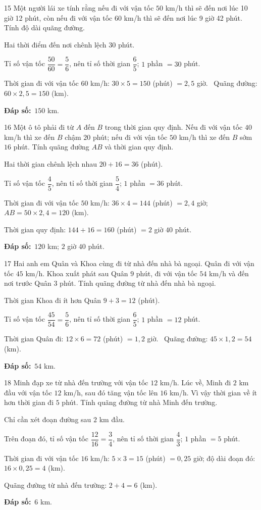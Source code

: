 \documentclass[11pt]{article}
\newif\ifsol \solfalse
\providecommand{\AnsWord}{Đáp số}
\newcommand{\dapso}[1]{\par\textbf{\AnsWord:}\ #1}
\newcommand{\probsol}[1]{%
  \begin{lrbox}{\solmeasure}\begin{minipage}{\dimexpr\linewidth-24pt\relax}#1\end{minipage}\end{lrbox}%
  \ifsol
    \begin{solbox}#1\end{solbox}%
  \else
    \setlength{\solht}{\dimexpr\ht\solmeasure+\dp\solmeasure+0.85cm\relax}%
    \ifdim\solht<1.35cm\setlength{\solht}{1.35cm}\fi
    \begin{tcolorbox}[colback=white,colframe=Line,boxrule=0.8pt,arc=5pt,
      left=8pt,right=8pt,top=4pt,bottom=4pt,height=\solht]{\footnotesize\color{Slate}\itshape\WorkWord}\end{tcolorbox}%
  \fi}
\newcommand{\gap}{\vspace{0.3cm}}
\def\WorkWord{Bài làm:}
\def\AnsWord{Đáp số}
\begin{document}
\gap
\begin{probbox}{15}{\relax}
Một người lái xe tính rằng nếu đi với vận tốc $50$ km/h thì sẽ đến nơi lúc 10 giờ 12 phút, còn nếu đi với vận tốc $60$ km/h thì sẽ đến nơi lúc 9 giờ 42 phút. Tính độ dài quãng đường.
\end{probbox}
\probsol{
Hai thời điểm đến nơi chênh lệch $30$ phút.\par Tỉ số vận tốc $\dfrac{50}{60}=\dfrac56$, nên tỉ số thời gian $\dfrac65$; $1$ phần $=30$ phút.\par
Thời gian đi với vận tốc $60$ km/h: $30\times5=150$ (phút) $=2{,}5$ giờ. \ Quãng đường: $60\times2{,}5=150$ (km).
\dapso{$150$ km.}}
\gap
\begin{probbox}{16}{\relax}
Một ô tô phải đi từ $A$ đến $B$ trong thời gian quy định. Nếu đi với vận tốc $40$ km/h thì xe đến $B$ chậm $20$ phút; nếu đi với vận tốc $50$ km/h thì xe đến $B$ sớm $16$ phút. Tính quãng đường $AB$ và thời gian quy định.
\end{probbox}
\probsol{
Hai thời gian chênh lệch nhau $20+16=36$ (phút).\par Tỉ số vận tốc $\dfrac45$, nên tỉ số thời gian $\dfrac54$; $1$ phần $=36$ phút.\par
Thời gian đi với vận tốc $50$ km/h: $36\times4=144$ (phút) $=2{,}4$ giờ; $AB=50\times2{,}4=120$ (km).\par
Thời gian quy định: $144+16=160$ (phút) $=2$ giờ $40$ phút.
\dapso{$120$ km; $2$ giờ $40$ phút.}}
\gap
\begin{probbox}{17}{\relax}
Hai anh em Quân và Khoa cùng đi từ nhà đến nhà bà ngoại. Quân đi với vận tốc $45$ km/h. Khoa xuất phát sau Quân $9$ phút, đi với vận tốc $54$ km/h và đến nơi trước Quân $3$ phút. Tính quãng đường từ nhà đến nhà bà ngoại.
\end{probbox}
\probsol{
Thời gian Khoa đi ít hơn Quân $9+3=12$ (phút).\par Tỉ số vận tốc $\dfrac{45}{54}=\dfrac56$, nên tỉ số thời gian $\dfrac65$; $1$ phần $=12$ phút.\par
Thời gian Quân đi: $12\times6=72$ (phút) $=1{,}2$ giờ. \ Quãng đường: $45\times1{,}2=54$ (km).
\dapso{$54$ km.}}
\gap
\begin{probbox}{18}{\relax}
Minh đạp xe từ nhà đến trường với vận tốc $12$ km/h. Lúc về, Minh đi $2$ km đầu với vận tốc $12$ km/h, sau đó tăng vận tốc lên $16$ km/h. Vì vậy thời gian về ít hơn thời gian đi $5$ phút. Tính quãng đường từ nhà Minh đến trường.
\end{probbox}
\probsol{
Chỉ cần xét đoạn đường sau $2$ km đầu.\par Trên đoạn đó, tỉ số vận tốc $\dfrac{12}{16}=\dfrac34$, nên tỉ số thời gian $\dfrac43$; $1$ phần $=5$ phút.\par
Thời gian đi với vận tốc $16$ km/h: $5\times3=15$ (phút) $=0{,}25$ giờ; độ dài đoạn đó: $16\times0{,}25=4$ (km).\par Quãng đường từ nhà đến trường: $2+4=6$ (km).
\dapso{$6$ km.}}
\end{document}
